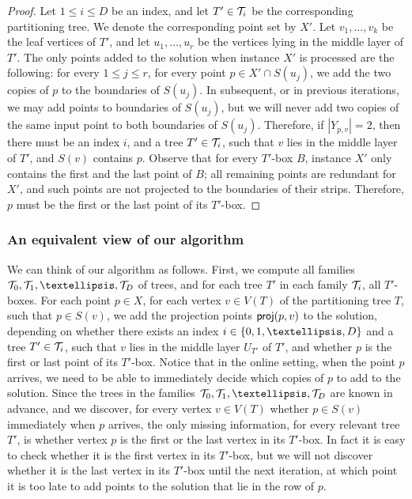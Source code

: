 \documentclass[11pt]{article}
\numberwithin{equation}{section}
\theoremstyle{definition}
\theoremstyle{plain}
\begin{document}
\begin{proof}
	Let $1\leq i\leq D$ be an index, and let $T'\in {\mathcal T}_i$ be the corresponding partitioning tree. We denote the corresponding point set by $X'$. Let $v_1,\ldots,v_k$ be the leaf vertices of $T'$, and let $u_1,\ldots,u_r$ be the vertices lying in the middle layer of $T'$. The only points added to the solution when instance $X'$ is processed are the following: for every $1\leq j\leq r$, for every point $p\in X'\cap S(u_j)$, we add the two copies of $p$ to the boundaries of $S(u_j)$. In subsequent, or in previous iterations, we may add points to boundaries of $S(u_j)$, but we will never add two copies of the same input point to both boundaries of $S(u_j)$. Therefore, if $|Y_{p,v}|=2$, then there must be an index $i$, and a tree $T'\in {\mathcal T}_i$, such that $v$ lies in the middle layer of $T'$, and $S(v)$ contains $p$. Observe that for every $T'$-box $B$, instance $X'$ only contains the first and the last point of $B$; all remaining points are redundant for $X'$, and such points are not projected to the boundaries of their strips. Therefore, $p$ must be the first or the last point of its $T'$-box.
	\end{proof}



\subsubsection{An equivalent view of our algorithm}


We can think of our algorithm as follows.
First, we compute all families $\tset_0,\tset_1, \ldots, \tset_D$ of trees, and for each tree $T'$ in each family ${\mathcal T}_i$, all $T'$-boxes.
For each point $p \in X$, for each vertex $v \in V(T)$ of the partitioning tree $T$, such that $p\in S(v)$, we add the projection points ${\sf proj}(p,v)$ to the solution, depending on whether there exists an index $i \in \set{0,1,\ldots, D}$ and a tree $T' \in {\mathcal T}_i$, such that $v$ lies in the middle layer $U_{T'}$ of $T'$,  and whether $p$ is the first or last point of its $T'$-box. Notice that in the online setting, when the point $p$ arrives, we need to be able to immediately decide which copies of $p$ to add to the solution. Since the trees in the families $\tset_0,\tset_1,\ldots,\tset_D$ are known in advance, and we discover, for every vertex $v\in V(T)$ whether $p\in S(v)$ immediately when $p$ arrives, the only missing information, for every relevant tree $T'$, is whether vertex $p$ is the first or the last vertex in its $T'$-box. In fact it is easy to check whether it is the first vertex in its $T'$-box, but we will not discover whether it is the last vertex in its $T'$-box until the next iteration, at which point it is too late to add points to the solution that lie in the row of $p$.
\end{document}
